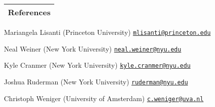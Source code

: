 \documentclass[11pt]{article}
\newenvironment{packed_itemize}{
\begin{itemize}[label=\raisebox{0.25ex}{\tiny$\bullet$}]
  \setlength{\itemsep}{3pt}
  \setlength{\parskip}{0pt}
  \setlength{\parsep}{0pt}}{\end{itemize}
}
\begin{document}

\noindent
\begin{tabular*}{\textwidth}{l@{\extracolsep{\fill}}}
\large {\sc \Large{References}}\\
\hline
\end{tabular*}

\begin{packed_itemize}
  \item Mariangela Lisanti (Princeton University) \hfill \href{mailto:mlisanti@princeton.edu}{\texttt{mlisanti@princeton.edu}}
  \item Neal Weiner (New York University) \hfill \href{mailto:neal.weiner@nyu.edu}{\texttt{neal.weiner@nyu.edu}}
  \item Kyle Cranmer (New York University) \hfill \href{mailto:kyle.cranmer@nyu.edu}{\texttt{kyle.cranmer@nyu.edu}}
  \item Joshua Ruderman (New York University) \hfill \href{mailto:ruderman@nyu.edu}{\texttt{ruderman@nyu.edu}}
  \item Christoph Weniger (University of Amsterdam) \hfill \href{mailto:c.weniger@uva.nl}{\texttt{c.weniger@uva.nl}}

\end{packed_itemize}


\vspace*{\fill}
\end{document}
